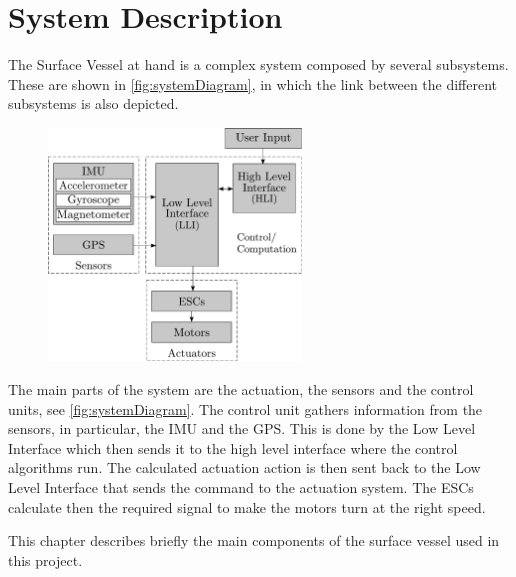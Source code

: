 \chapter{System Description}
The Surface Vessel at hand is a complex system composed by several subsystems. These are shown in \autoref{fig:systemDiagram}, in which the link between the different subsystems is also depicted.
\begin{figure}[H]
    \includegraphics[width=0.6\textwidth]{figures/systemDiagram}
    \caption{}
    \label{fig:systemDiagram}
\end{figure}
The main parts of the system are the actuation, the sensors and the control units, see \autoref{fig:systemDiagram}. The control unit gathers information from the sensors, in particular, the IMU and the GPS. This is done by the Low Level Interface which then sends it to the high level interface where the control algorithms run. The calculated actuation action is then sent back to the Low Level Interface that sends the command to the actuation system. The ESCs calculate then the required signal to make the motors turn at the right speed. 

This chapter describes briefly the main components of the surface vessel used in this project. \cite{aauship}

